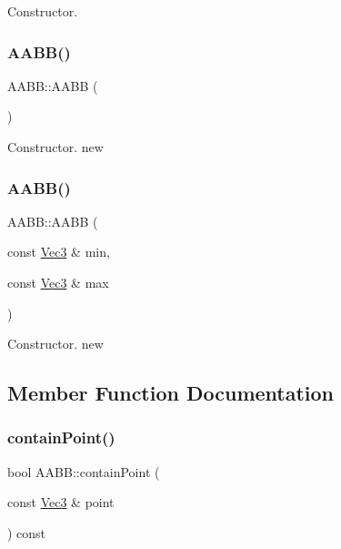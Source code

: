 Constructor. \mbox{\label{classAABB_a5f5baf6c533905aa1456b3a3eb57bab2}} 
\subsubsection{\texorpdfstring{A\+A\+B\+B()}{AABB()}\hspace{0.1cm}{\footnotesize\ttfamily [4/5]}}
{\footnotesize\ttfamily A\+A\+B\+B\+::\+A\+A\+BB (\begin{DoxyParamCaption}{ }\end{DoxyParamCaption})}

Constructor.  new \mbox{\label{classAABB_a752c7688271964a668be954aaadb7faa}} 
\subsubsection{\texorpdfstring{A\+A\+B\+B()}{AABB()}\hspace{0.1cm}{\footnotesize\ttfamily [5/5]}}
{\footnotesize\ttfamily A\+A\+B\+B\+::\+A\+A\+BB (\begin{DoxyParamCaption}\item[{const \hyperlink{classVec3}{Vec3} \&}]{min,  }\item[{const \hyperlink{classVec3}{Vec3} \&}]{max }\end{DoxyParamCaption})}

Constructor.  new 

\subsection{Member Function Documentation}
\mbox{\label{classAABB_a5ff6408910dc4efafc325458a44a7835}} 
\subsubsection{\texorpdfstring{contain\+Point()}{containPoint()}\hspace{0.1cm}{\footnotesize\ttfamily [1/2]}}
{\footnotesize\ttfamily bool A\+A\+B\+B\+::contain\+Point (\begin{DoxyParamCaption}\item[{const \hyperlink{classVec3}{Vec3} \&}]{point }\end{DoxyParamCaption}) const}

